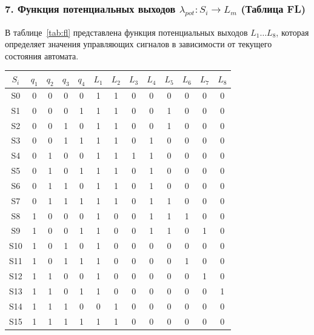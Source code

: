 \documentclass[11pt,a4paper,final]{article}
\begin{document}
	\subsubsection*{7. Функция потенциальных выходов \( \lambda_{pot}: S_i \rightarrow L_m \) (Таблица FL)}
	В таблице~\ref{tab:fl} представлена функция потенциальных выходов \(L_1 \ldots L_8\), которая определяет значения управляющих сигналов в зависимости от текущего состояния автомата.
	
	\begin{center}
		\label{tab:fl}
		\scriptsize
		\begin{tabular}{|c||c|c|c|c||c|c|c|c|c|c|c|c|}
			\hline
			\( S_i \) & \( q_1 \) & \( q_2 \) & \( q_3 \) & \( q_4 \) & \( L_1 \) & \( L_2 \) & \( L_3 \) & \( L_4 \) & \( L_5 \) & \( L_6 \) & \( L_7 \) & \( L_8 \) \\
			\hline\hline
			S0 & 0 & 0 & 0 & 0 & 1 & 1 & 0 & 0 & 0 & 0 & 0 & 0 \\
			S1 & 0 & 0 & 0 & 1 & 1 & 1 & 0 & 0 & 1 & 0 & 0 & 0 \\
			S2 & 0 & 0 & 1 & 0 & 1 & 1 & 0 & 0 & 1 & 0 & 0 & 0 \\
			S3 & 0 & 0 & 1 & 1 & 1 & 1 & 0 & 1 & 0 & 0 & 0 & 0 \\
			S4 & 0 & 1 & 0 & 0 & 1 & 1 & 1 & 1 & 0 & 0 & 0 & 0 \\
			S5 & 0 & 1 & 0 & 1 & 1 & 1 & 0 & 1 & 0 & 0 & 0 & 0 \\
			S6 & 0 & 1 & 1 & 0 & 1 & 1 & 0 & 1 & 0 & 0 & 0 & 0 \\
			S7 & 0 & 1 & 1 & 1 & 1 & 1 & 0 & 1 & 1 & 0 & 0 & 0 \\
			S8 & 1 & 0 & 0 & 0 & 1 & 0 & 0 & 1 & 1 & 1 & 0 & 0 \\
			S9 & 1 & 0 & 0 & 1 & 1 & 0 & 0 & 1 & 1 & 0 & 1 & 0 \\
			S10 & 1 & 0 & 1 & 0 & 1 & 0 & 0 & 0 & 0 & 0 & 0 & 0 \\
			S11 & 1 & 0 & 1 & 1 & 1 & 0 & 0 & 0 & 0 & 1 & 0 & 0 \\
			S12 & 1 & 1 & 0 & 0 & 1 & 0 & 0 & 0 & 0 & 0 & 1 & 0 \\
			S13 & 1 & 1 & 0 & 1 & 1 & 0 & 0 & 0 & 0 & 0 & 0 & 1 \\
			S14 & 1 & 1 & 1 & 0 & 0 & 1 & 0 & 0 & 0 & 0 & 0 & 0 \\
			S15 & 1 & 1 & 1 & 1 & 1 & 1 & 0 & 0 & 0 & 0 & 0 & 0 \\
			\hline
		\end{tabular}
	\end{center}
	
\end{document}
